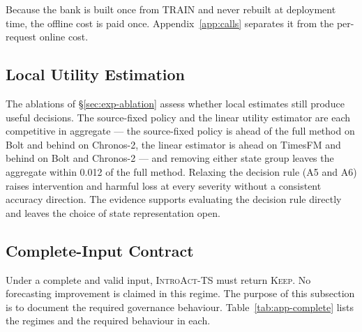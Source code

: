 \documentclass{article}
\newcommand{\introact}{\textsc{IntroAct-TS}}
\begin{document}
Because the bank is built once from TRAIN and never rebuilt at deployment time, the offline
cost is paid once. Appendix~\ref{app:calls} separates it from the per-request online cost.

\subsection{Local Utility Estimation}
\label{app:transfer}
The ablations of \S\ref{sec:exp-ablation} assess whether local estimates still produce
useful decisions. The source-fixed policy and the linear utility estimator are each
competitive in aggregate — the source-fixed policy is ahead of the full method on Bolt and
behind on Chronos-2, the linear estimator is ahead on TimesFM and behind on Bolt and
Chronos-2 — and removing either state group leaves the aggregate within 0.012 of the full
method. Relaxing the decision rule (A5 and A6) raises intervention and harmful loss at
every severity without a consistent accuracy direction. The evidence supports evaluating
the decision rule directly and leaves the choice of state representation open.

\subsection{Complete-Input Contract}
\label{app:contract}
Under a complete and valid input, \introact{} must return \textsc{Keep}. No forecasting
improvement is claimed in this regime. The purpose of this subsection is to document the
required governance behaviour. Table~\ref{tab:app-complete} lists the
regimes and the required behaviour in each.

\begin{table}[htbp]
  \caption{Governance contract by input regime. The complete-input rows are contract
  statements and not accuracy results. The expected behaviour there is a no-op, and a non-no-op
  would violate the input-preservation requirement.}
  \label{tab:app-complete}
  \centering
  \small
  \setlength{\tabcolsep}{4pt}
\end{table}
\end{document}
